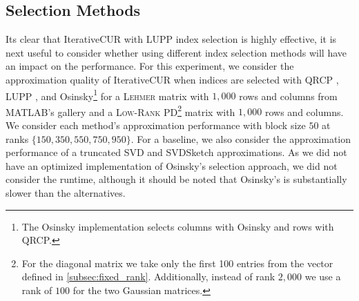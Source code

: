 \subsection{Selection Methods}
Its clear that IterativeCUR with LUPP index selection is highly effective, it is next useful to consider whether using different index selection methods will have an impact on the performance. For this experiment, we consider the approximation quality of IterativeCUR when indices are selected with QRCP \cite{martinsson2017householder}, LUPP \cite{dong2023simpler}, and Osinsky\footnote{The Osinsky implementation selects columns with Osinsky and rows with QRCP.} \cite{osinsky2025close} for a \textsc{Lehmer} matrix with $1,000$ rows and columns from MATLAB's gallery and a  \textsc{Low-Rank PD}\footnote{For the diagonal matrix we take only the first 100 entries from the vector defined in \cref{subsec:fixed_rank}. Additionally, instead of rank $2,000$ we use a rank of $100$ for the two Gaussian matrices.} matrix with $1,000$ rows and columns. We consider each method's approximation performance with block size $50$ at ranks $\{150, 350, 550, 750,950\}$. For a baseline, we also consider the approximation performance of a truncated SVD and SVDSketch approximations. As we did not have an optimized implementation of Osinsky's selection approach, we did not consider the runtime, although it should be noted that Osinsky's is substantially slower than the alternatives.

